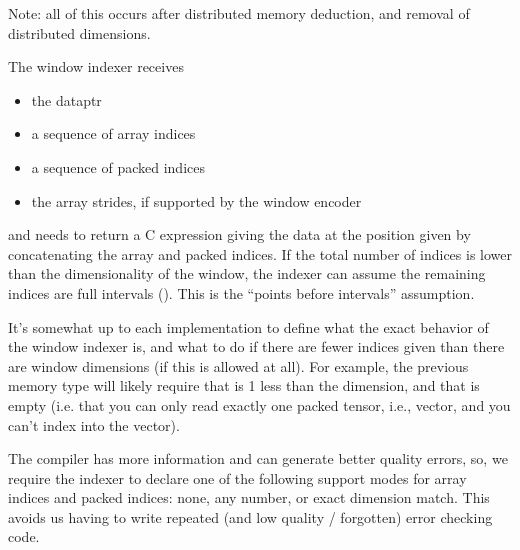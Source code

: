 

\filbreak
Note: all of this occurs after distributed memory deduction, and removal of distributed dimensions.

\filbreak
{}

\filbreak
The window indexer receives
\begin{itemize}
  \item the dataptr
  \filbreak
  \item a sequence of array indices
  \filbreak
  \item a sequence of packed indices
  \filbreak
  \item the array strides, if supported by the window encoder
\end{itemize}

\filbreak
and needs to return a C expression giving the data at the position given by concatenating the array and packed indices.
If the total number of indices is lower than the dimensionality of the window, the indexer can assume the remaining indices are full intervals (\lighttt{:}).
This is the ``points before intervals'' assumption.

\filbreak
It's somewhat up to each  implementation to define what the exact behavior of the window indexer is, and what to do if there are fewer indices given than there are window dimensions (if this is allowed at all).
For example, the previous  memory type will likely require that  is 1 less than the dimension, and that  is empty
(i.e. that you can only read exactly one packed tensor, i.e.,  vector, and you can't index into the vector).

\filbreak
The compiler has more information and can generate better quality errors, so, we require the indexer to declare one of the following support modes for array indices and packed indices: none, any number, or exact dimension match.
This avoids us having to write repeated (and low quality / forgotten) error checking code.

